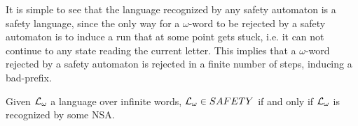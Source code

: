 It is simple to see that the language recognized by any safety automaton is a safety language, since the only way for a $\omega$-word to be rejected by a safety automaton is to induce a run that at some point gets stuck, i.e. it can not continue to any state reading the current letter. This implies that a $\omega$-word rejected by a safety automaton is rejected in a finite number of steps, inducing a bad-prefix.  

\begin{theorem}
Given $\mathcal{L}{}_\omega{}$ a language over infinite words, $\mathcal{L}{}_\omega{} \in SAFETY$ if and only if $\mathcal{L}{}_\omega{}$ is recognized by some NSA.
\end{theorem}
